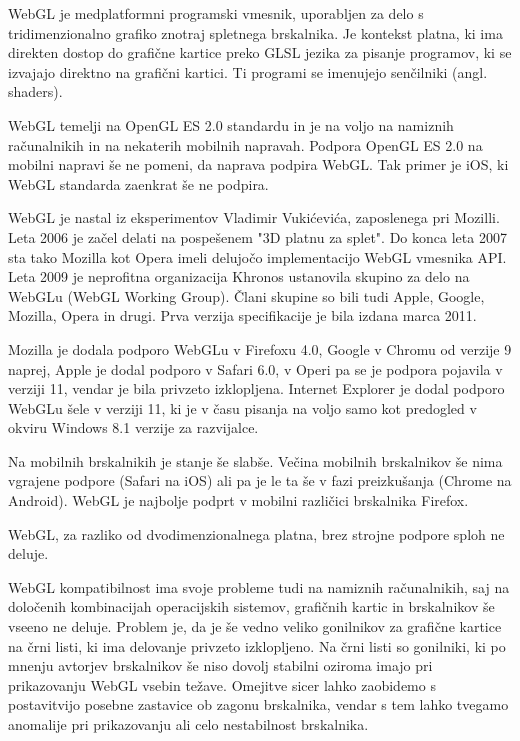 WebGL \cite{webgl} je medplatformni programski vmesnik, uporabljen za delo s tridimenzionalno grafiko znotraj spletnega brskalnika. Je kontekst platna, ki ima direkten dostop do grafične kartice preko GLSL jezika za pisanje programov, ki se izvajajo direktno na grafični kartici. Ti programi se imenujejo senčilniki (angl. shaders). 

WebGL temelji na OpenGL ES 2.0 standardu in je na voljo na namiznih računalnikih in na nekaterih mobilnih napravah. Podpora OpenGL ES 2.0 na mobilni napravi še ne pomeni, da naprava podpira WebGL. Tak primer je iOS, ki WebGL standarda zaenkrat še ne podpira.

WebGL je nastal iz eksperimentov Vladimir Vukićevića, zaposlenega pri Mozilli. Leta 2006 je začel delati na pospešenem "3D platnu za splet". Do konca leta 2007 sta tako Mozilla kot Opera imeli delujočo implementacijo WebGL vmesnika API. Leta 2009 je neprofitna organizacija Khronos ustanovila skupino za delo na WebGLu (WebGL Working Group). Člani skupine so bili tudi Apple, Google, Mozilla, Opera in drugi. Prva verzija specifikacije je bila izdana marca 2011.

Mozilla je dodala podporo WebGLu v Firefoxu 4.0, Google v Chromu od verzije 9 naprej, Apple je dodal podporo v Safari 6.0, v Operi pa se je podpora pojavila v verziji 11, vendar je bila privzeto izklopljena. Internet Explorer je dodal podporo WebGLu šele v verziji 11, ki je v času pisanja na voljo samo kot predogled v okviru Windows 8.1 verzije za razvijalce.

Na mobilnih brskalnikih je stanje še slabše. Večina mobilnih brskalnikov še nima vgrajene podpore (Safari na iOS) ali pa je le ta še v fazi preizkušanja (Chrome na Android). WebGL je najbolje podprt v mobilni različici brskalnika Firefox.

WebGL, za razliko od dvodimenzionalnega platna, brez strojne podpore sploh ne deluje. 

WebGL kompatibilnost ima svoje probleme tudi na namiznih računalnikih, saj na določenih kombinacijah operacijskih sistemov, grafičnih kartic in brskalnikov še vseeno ne deluje. Problem je, da je še vedno veliko gonilnikov za grafične kartice na črni listi, ki ima delovanje privzeto izklopljeno. Na črni listi so gonilniki, ki po mnenju avtorjev brskalnikov še niso dovolj stabilni oziroma imajo pri prikazovanju WebGL vsebin težave. Omejitve sicer lahko zaobidemo s postavitvijo posebne zastavice ob zagonu brskalnika, vendar s tem lahko tvegamo anomalije pri prikazovanju ali celo nestabilnost brskalnika.

